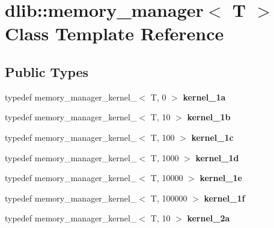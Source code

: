 \hypertarget{classdlib_1_1memory__manager}{
\section{dlib::memory\_\-manager$<$ T $>$ Class Template Reference}
\label{classdlib_1_1memory__manager}
}
\subsection*{Public Types}
\begin{DoxyCompactItemize}
\item 
\hypertarget{classdlib_1_1memory__manager_a34db9666ff171f7261bef5aa97625fad}{
typedef memory\_\-manager\_\-kernel\_$<$ T, 0 $>$ {\bfseries kernel\_\-1a}}
\label{classdlib_1_1memory__manager_a34db9666ff171f7261bef5aa97625fad}

\item 
\hypertarget{classdlib_1_1memory__manager_aa90b06a6aa5a7b1475841aeea6d37c7a}{
typedef memory\_\-manager\_\-kernel\_$<$ T, 10 $>$ {\bfseries kernel\_\-1b}}
\label{classdlib_1_1memory__manager_aa90b06a6aa5a7b1475841aeea6d37c7a}

\item 
\hypertarget{classdlib_1_1memory__manager_a81b1c87444251dc230278d25c2bb3e24}{
typedef memory\_\-manager\_\-kernel\_$<$ T, 100 $>$ {\bfseries kernel\_\-1c}}
\label{classdlib_1_1memory__manager_a81b1c87444251dc230278d25c2bb3e24}

\item 
\hypertarget{classdlib_1_1memory__manager_acd81fed30519efa774677c767f456707}{
typedef memory\_\-manager\_\-kernel\_$<$ T, 1000 $>$ {\bfseries kernel\_\-1d}}
\label{classdlib_1_1memory__manager_acd81fed30519efa774677c767f456707}

\item 
\hypertarget{classdlib_1_1memory__manager_a013fe774ff657e1da4c1858d143ed42e}{
typedef memory\_\-manager\_\-kernel\_$<$ T, 10000 $>$ {\bfseries kernel\_\-1e}}
\label{classdlib_1_1memory__manager_a013fe774ff657e1da4c1858d143ed42e}

\item 
\hypertarget{classdlib_1_1memory__manager_a383a6d41a824d5260c4125204c62f77e}{
typedef memory\_\-manager\_\-kernel\_$<$ T, 100000 $>$ {\bfseries kernel\_\-1f}}
\label{classdlib_1_1memory__manager_a383a6d41a824d5260c4125204c62f77e}

\item 
\hypertarget{classdlib_1_1memory__manager_a80007abb5fd39cb44e23441d0b287f48}{
typedef memory\_\-manager\_\-kernel\_$<$ T, 10 $>$ {\bfseries kernel\_\-2a}}
\label{classdlib_1_1memory__manager_a80007abb5fd39cb44e23441d0b287f48}


\end{DoxyCompactItemize}
